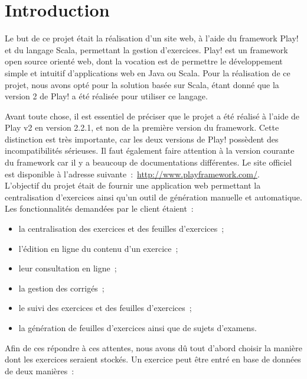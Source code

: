 


\maketitle
\newpage
\tableofcontents
\newpage
\section{Introduction}
Le but de ce projet était la réalisation d'un site web, à l'aide du framework Play! et du langage Scala, permettant la gestion d'exercices.
Play! est un framework open source orienté web, dont la vocation est de permettre le développement simple et intuitif d'applications web en Java ou Scala. Pour la réalisation de ce projet, nous avons opté pour la solution basée sur Scala, étant donné que la version 2 de Play! a été réalisée pour utiliser ce langage. 

Avant toute chose, il est essentiel de préciser que le projet a été réalisé à l'aide de Play v2 en version 2.2.1, et non de la première version du framework. Cette distinction est très importante, car les deux versions de Play! possèdent des incompatibilités sérieuses. Il faut également faire attention à la version courante du framework car il y a beaucoup de documentations différentes. Le site officiel est disponible à l'adresse suivante~:~\url{http://www.playframework.com/}.\\

L'objectif du projet était de fournir une application web permettant la centralisation d'exercices ainsi qu'un outil de génération manuelle et automatique. Les fonctionnalités demandées par le client étaient~:
\smallskip

\begin{itemize}
\item la centralisation des exercices et des feuilles d'exercices~;
\item l'édition en ligne du contenu d'un exercice~;
\item leur consultation en ligne~;
\item la gestion des corrigés~;
\item le suivi des exercices et des feuilles d'exercices~;
\item la génération de feuilles d'exercices ainsi que de sujets d'examens.
\end{itemize}

\medskip
Afin de ces répondre à ces attentes, nous avons dû tout d'abord choisir la manière dont les exercices seraient stockés. Un exercice peut être entré en base de données de deux manières~: 

